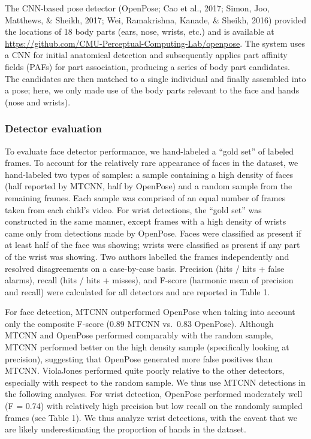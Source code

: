 \documentclass[english,man,floatsintext,draftall]{apa6}
\begin{document}
The CNN-based pose detector (OpenPose; Cao et al., 2017; Simon, Joo,
Matthews, \& Sheikh, 2017; Wei, Ramakrishna, Kanade, \& Sheikh, 2016)
provided the locations of 18 body parts (ears, nose, wrists, etc.) and
is available at
\url{https://github.com/CMU-Perceptual-Computing-Lab/openpose}. The
system uses a CNN for initial anatomical detection and subsequently
applies part affinity fields (PAFs) for part association, producing a
series of body part candidates. The candidates are then matched to a
single individual and finally assembled into a pose; here, we only made
use of the body parts relevant to the face and hands (nose and wrists).

\subsubsection{Detector evaluation}\label{detector-evaluation}

To evaluate face detector performance, we hand-labeled a \enquote{gold
set} of labeled frames. To account for the relatively rare appearance of
faces in the dataset, we hand-labeled two types of samples: a sample
containing a high density of faces (half reported by MTCNN, half by
OpenPose) and a random sample from the remaining frames. Each sample was
comprised of an equal number of frames taken from each child's video.
For wrist detections, the \enquote{gold set} was constructed in the same
manner, except frames with a high density of wrists came only from
detections made by OpenPose. Faces were classified as present if at
least half of the face was showing; wrists were classified as present if
any part of the wrist was showing. Two authors labelled the frames
independently and resolved disagreements on a case-by-case basis.
Precision (hits / hits + false alarms), recall (hits / hits + misses),
and F-score (harmonic mean of precision and recall) were calculated for
all detectors and are reported in Table 1.

For face detection, MTCNN outperformed OpenPose when taking into account
only the composite F-score (0.89 MTCNN vs.~0.83 OpenPose). Although
MTCNN and OpenPose performed comparably with the random sample, MTCNN
performed better on the high density sample (specifically looking at
precision), suggesting that OpenPose generated more false positives than
MTCNN. ViolaJones performed quite poorly relative to the other
detectors, especially with respect to the random sample. We thus use
MTCNN detections in the following analyses. For wrist detection,
OpenPose performed moderately well (F = 0.74) with relatively high
precision but low recall on the randomly sampled frames (see Table 1).
We thus analyze wrist detections, with the caveat that we are likely
underestimating the proportion of hands in the dataset.
\end{document}
